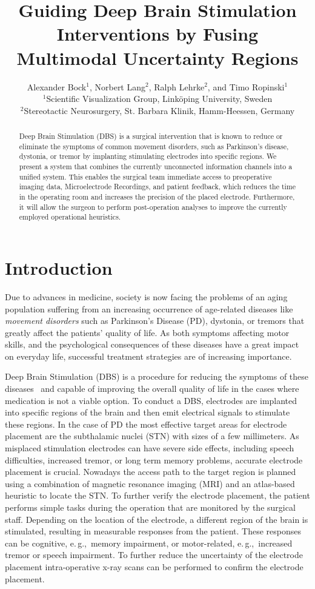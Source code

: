 \documentclass{egpubl}
\title{Guiding Deep Brain Stimulation Interventions by Fusing Multimodal Uncertainty Regions}
\author[Bock et al.]{
Alexander Bock$^1$,
Norbert Lang$^2$,
Ralph Lehrke$^2$,
and Timo Ropinski$^1$\\
$^1$Scientific Visualization Group, Link\"oping University, Sweden\\
$^2$Stereotactic Neurosurgery, St. Barbara Klinik, Hamm-Heessen, Germany
}
\begin{document}
\maketitle
\begin{abstract}
Deep Brain Stimulation (DBS) is a surgical intervention that is known to reduce or eliminate the symptoms of common movement disorders, such as Parkinson's disease, dystonia, or tremor by implanting stimulating electrodes into specific regions. We present a system that combines the currently unconnected information channels into a unified system. This enables the surgical team immediate access to preoperative imaging data, Microelectrode Recordings, and patient feedback, which reduces the time in the operating room and increases the precision of the placed electrode. Furthermore, it will allow the surgeon to perform post-operation analyses to improve the currently employed operational heuristics.
\begin{classification}
\end{classification}
\end{abstract}

\section{Introduction}\label{sec:introduction}
Due to advances in medicine, society is now facing the problems of an aging population suffering from an increasing occurrence of age-related diseases like \emph{movement disorders} such as Parkinson's Disease (PD), dystonia, or tremors that greatly affect the patients' quality of life. As both symptoms affecting motor skills, and the psychological consequences of these diseases have a great impact on everyday life, successful treatment strategies are of increasing importance.

Deep Brain Stimulation (DBS) is a procedure for reducing the symptoms of these diseases~\cite{Benabid2009} and capable of improving the overall quality of life in the cases where medication is not a viable option. To conduct a DBS, electrodes are implanted into specific regions of the brain and then emit electrical signals to stimulate these regions. In the case of PD the most effective target areas for electrode placement are the subthalamic nuclei (STN) with sizes of a few millimeters. As misplaced stimulation electrodes can have severe side effects, including speech difficulties, increased tremor, or long term memory problems, accurate electrode placement is crucial. Nowadays the access path to the target region is planned using a combination of magnetic resonance imaging (MRI) and an atlas-based heuristic to locate the STN. To further verify the electrode placement, the patient performs simple tasks during the operation that are monitored by the surgical staff. Depending on the location of the electrode, a different region of the brain is stimulated, resulting in measurable responses from the patient. These responses can be cognitive, e.\,g.,~memory impairment, or motor-related, e.\,g.,~increased tremor or speech impairment. To further reduce the uncertainty of the electrode placement intra-operative x-ray scans can be performed to confirm the electrode placement.
\end{document}
